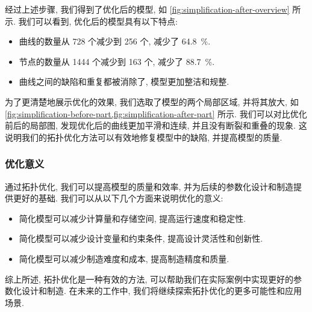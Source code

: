 经过上述步骤, 我们得到了优化后的模型, 如 \cref{fig:simplification-after-overview} 所示.
我们可以看到, 优化后的模型具有以下特点:
\begin{itemize}
  \item 曲线的数量从 \num{728} 个减少到 \num{256} 个, 减少了 \SI{64.8}{\percent}.
  \item 节点的数量从 \num{1444} 个减少到 \num{163} 个, 减少了 \SI{88.7}{\percent}.
  \item 曲线之间的缺陷和重复都被消除了, 模型更加整洁和规整.
\end{itemize}

为了更清楚地展示优化的效果, 我们选取了模型的两个局部区域, 并将其放大, 如 \cref{fig:simplification-before-part,fig:simplification-after-part} 所示.
我们可以对比优化前后的局部图, 发现优化后的曲线更加平滑和连续, 并且没有断裂和重叠的现象.
这说明我们的拓扑优化方法可以有效地修复模型中的缺陷, 并提高模型的质量.

\subsubsection{优化意义}

通过拓扑优化, 我们可以提高模型的质量和效率, 并为后续的参数化设计和制造提供更好的基础.
我们可以从以下几个方面来说明优化的意义:
\begin{itemize}
  \item 简化模型可以减少计算量和存储空间, 提高运行速度和稳定性.
  \item 简化模型可以减少设计变量和约束条件, 提高设计灵活性和创新性.
  \item 简化模型可以减少制造难度和成本, 提高制造精度和质量.
\end{itemize}

综上所述, 拓扑优化是一种有效的方法, 可以帮助我们在实际案例中实现更好的参数化设计和制造.
在未来的工作中, 我们将继续探索拓扑优化的更多可能性和应用场景.
